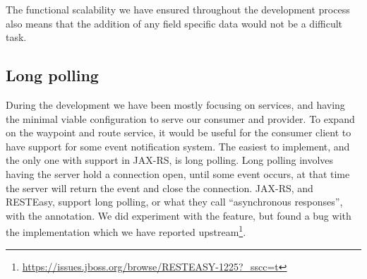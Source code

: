 The functional scalability we have ensured throughout the development process also means that the addition of any field specific data would not be a difficult task.

\subsection{Long polling}
During the development we have been mostly focusing on services, and having the
minimal viable configuration to serve our consumer and provider. To expand on
the waypoint and route service, it would be useful for the consumer client to
have support for some event notification system. The easiest to implement, and
the only one with support in JAX-RS, is long polling. Long polling involves
having the server hold a connection open, until some event occurs, at that time
the server will return the event and close the connection. JAX-RS, and RESTEasy,
support long polling, or what they call ``asynchronous responses'', with the
 annotation. We did experiment with the feature, but found
a bug with the implementation which we have reported
upstream\footnote{\url{https://issues.jboss.org/browse/RESTEASY-1225?_sscc=t}}.
